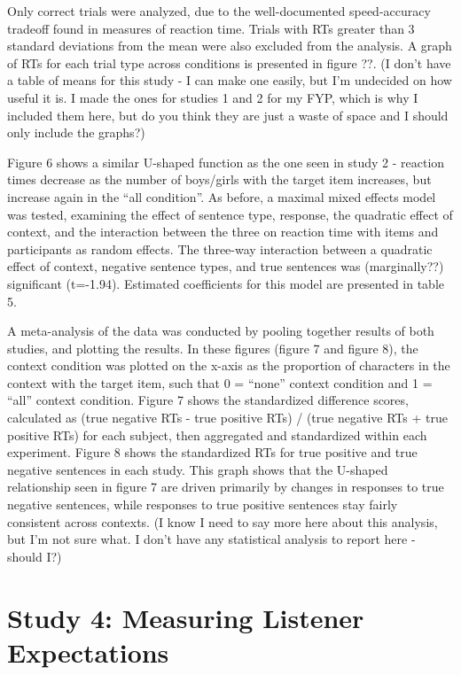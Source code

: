 \documentclass[10pt,letterpaper]{article}
\begin{document}
Only correct trials were analyzed, due to the well-documented speed-accuracy tradeoff found in measures of reaction time.  Trials with RTs greater than 3 standard deviations from the mean were also excluded from the analysis. A graph of RTs for each trial type across conditions is presented in figure ??.   (I don't have a table of means for this study - I can make one easily, but I'm undecided on how useful it is.  I made the ones for studies 1 and 2 for my FYP, which is why I included them here, but do you think they are just a waste of space and I should only include the graphs?)

Figure 6 shows a similar U-shaped function as the one seen in study 2 - reaction times decrease as the number of boys/girls with the target item increases, but increase again in the ``all condition''.  As before, a maximal mixed effects model was tested, examining the effect of sentence type, response, the quadratic effect of context, and the interaction between the three on reaction time with items and participants as random effects.  The three-way interaction between a quadratic effect of context, negative sentence types, and true sentences was (marginally??) significant (t=-1.94).  Estimated coefficients for this model are presented in table 5.  

A meta-analysis of the data was conducted by pooling together results of both studies, and plotting the results.  In these figures (figure 7 and figure 8), the context condition was plotted on the x-axis as the proportion of characters in the context with the target item, such that 0 = ``none'' context condition and 1 = ``all'' context condition.  Figure 7 shows the standardized difference scores, calculated as (true negative RTs - true positive RTs) / (true negative RTs + true positive RTs) for each subject, then aggregated and standardized within each experiment.  Figure 8 shows the standardized RTs for true positive and true negative sentences in each study.  This graph shows that the U-shaped relationship seen in figure 7 are driven primarily by changes in responses to true negative sentences, while responses to true positive sentences stay fairly consistent across contexts.  (I know I need to say more here about this analysis, but I'm not sure what.  I don't have any statistical analysis to report here - should I?)



\section{Study 4: Measuring Listener Expectations}
\end{document}
